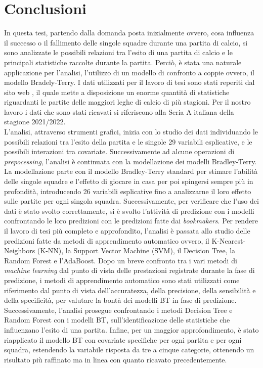 \chapter{Conclusioni}
\label{cap:conclusioni}

In questa tesi, partendo dalla domanda posta inizialmente ovvero, cosa influenza il successo o il fallimento delle singole squadre durante una partita di calcio, si sono analizzate le possibili relazioni tra l'esito di una partita di calcio e le principali statistiche raccolte durante la partita. Perciò, è stata una naturale applicazione per l'analisi, l'utilizzo di un modello di confronto a coppie ovvero, il modello Bradely-Terry. I dati utilizzati per il lavoro di tesi sono stati reperiti dal sito web \textit{\cite{fbref}}, il quale mette a disposizione un enorme quantità di statistiche riguardanti le partite delle maggiori leghe di calcio di più stagioni. Per il nostro lavoro i dati che sono stati ricavati si riferiscono alla Seria A italiana della stagione 2021/2022.\\
L'analisi, attraverso strumenti grafici, inizia con lo studio dei dati individuando le possibili relazioni tra l'esito della partita e le singole 29 variabili esplicative, e le possibili interazioni tra covariate. Successivamente ad alcune operazioni di \emph{prepocessing}, l'analisi è continuata con la modellazione dei modelli Bradley-Terry. La modellazione parte con il modello Bradley-Terry standard per stimare l'abilità delle singole squadre e l'effetto di giocare in casa per poi spingersi sempre più in profondità, introducendo 26 variabili esplicative fino a analizzarne il loro effetto sulle partite per ogni singola squadra. Successivamente, per verificare che l'uso dei dati è stato svolto correttamente, si è svolto l'attività di predizione con i modelli confrontando le loro predizioni con le predizioni fatte dai \emph{bookmakers}. Per rendere il lavoro di tesi più completo e approfondito, l'analisi è passata allo studio delle predizioni fatte da metodi di apprendimento automatico ovvero, il K-Nearest-Neighbors (K-NN), la Support Vector Machine (SVM), il Decision Tree, la Random Forest e l'AdaBoost. Dopo un breve confronto tra i vari metodi di \emph{machine learning} dal punto di vista delle prestazioni registrate durante la fase di predizione, i metodi di apprendimento automatico sono stati utilizzati come riferimento dal punto di vista dell'accuratezza, della precisione, della sensibilità e della specificità, per valutare la bontà dei modelli BT in fase di predizione. Successivamente, l'analisi prosegue confrontando i metodi Decision Tree e Random Forest con i modelli BT, sull'identificazione delle statistiche che influenzano l'esito di una partita. Infine, per un maggior approfondimento, è stato riapplicato il modello BT con covariate specifiche per ogni partita e per ogni squadra, estendendo la variabile risposta da tre a cinque categorie, ottenendo un risultato più raffinato ma in linea con quanto ricavato precedentemente.\\
